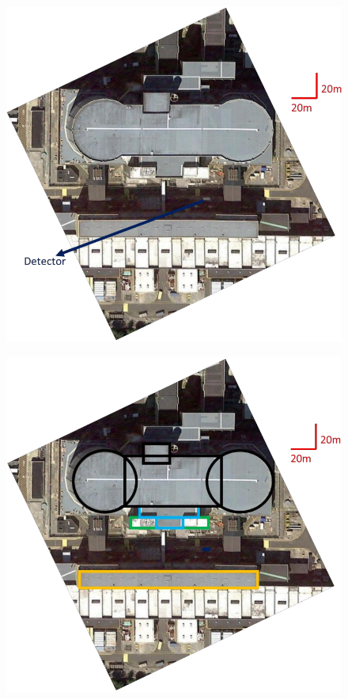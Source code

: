\begin{figure}[H]
 \centering
 \includegraphics[width=\linewidth]{Chapter5/Figs/Raster/wylfaTraceStep0.png}
 \label{fig:wylfaTraceStep0}
\end{figure}

\begin{figure}[H]
 \centering
 \includegraphics[width=\linewidth]{Chapter5/Figs/Raster/wylfaTraceStep1.png}
 \label{fig:wylfaTraceStep1}
\end{figure}


